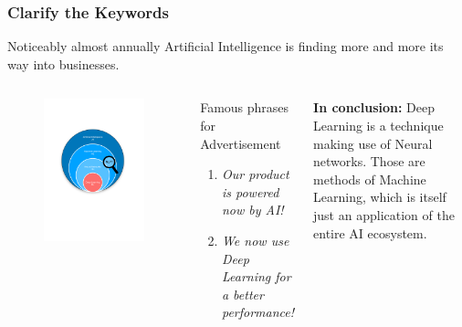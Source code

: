 \documentclass{beamer}
\begin{document}
\begin{frame}
\frametitle{Clarify the Keywords}
Noticeably almost annually Artificial Intelligence is finding more and more its way into businesses. 
\begin{columns}
	\begin{figure}
		\includegraphics[width=1.15\linewidth]{photo/intro_0}
	\end{figure}
	\begin{block}{Famous phrases for Advertisement}
		\begin{enumerate}
			\item \textit{Our product is powered now by AI!} 
			\item \textit{We now use Deep Learning for a better performance!}
		\end{enumerate}
	\end{block}
\textbf{In conclusion:} Deep Learning is a technique making use of Neural networks. Those are methods of Machine Learning, which is itself just an application of the entire AI ecosystem.
\end{columns}
\end{frame}
\end{document}
